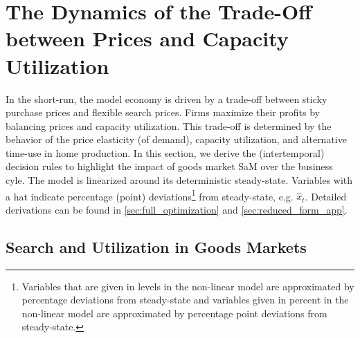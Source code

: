 \documentclass[12pt,3p,authoryear,review]{elsarticle}
\begin{document}
\section{The Dynamics of the Trade-Off between Prices and Capacity Utilization}\label{sec:dynamics}%
In the short-run, the model economy is driven by a trade-off between sticky purchase prices and flexible search prices. Firms maximize their profits by balancing prices and capacity utilization. This trade-off is determined by the behavior of the price elasticity (of demand), capacity utilization, and alternative time-use in home production. In this section, we derive the (intertemporal) decision rules to highlight the impact of goods market SaM over the business cyle. The model is linearized around its deterministic steady-state. Variables with a hat indicate percentage (point) deviations\footnote{Variables that are given in levels in the non-linear model are approximated by percentage deviations from steady-state and variables given in percent in the non-linear model are approximated by percentage point deviations from steady-state.} from steady-state, e.g. $\hat{x}_t$. Detailed derivations can be found in \ref{sec:full_optimization} and \ref{sec:reduced_form_app}.%
\subsection{Search and Utilization in Goods Markets}%
\end{document}
